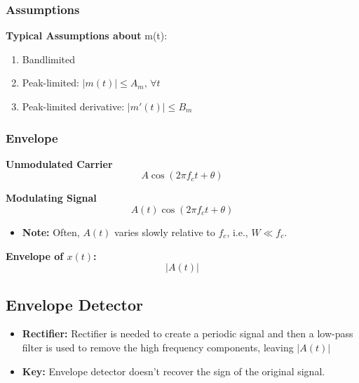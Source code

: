 \subsubsection{Assumptions}
\begin{definition}
    \textbf{Typical Assumptions about } m(t):
    \begin{enumerate}
        \item Bandlimited
        \item Peak-limited: $|m(t)| \leq A_m, \, \forall t$
        \item Peak-limited derivative: $|m'(t)| \leq B_m$
    \end{enumerate}
\end{definition}

\subsubsection{Envelope}
\begin{definition}
    \textbf{Unmodulated Carrier}
    \[
    A \cos(2 \pi f_c t + \theta)
    \]
    \vspace{1em}

    \textbf{Modulating Signal}
    \[
    A(t) \cos(2 \pi f_c t + \theta)
    \]
    \begin{itemize}
        \item \textbf{Note:} Often, \( A(t) \) varies slowly relative to \( f_c \), i.e., \( W \ll f_c \).
    \end{itemize}
    \vspace{1em}

    \textbf{Envelope of $x(t)$:}
    \[
    |A(t)|
    \]
\end{definition}

\subsection{Envelope Detector}
\begin{definition}
    \begin{itemize}
        \item \textbf{Rectifier:} Rectifier is needed to create a periodic signal and then a low-pass filter is used to remove the high frequency components, leaving $|A(t)|$
        \item \textbf{Key:} Envelope detector doesn't recover the sign of the original signal. 
    \end{itemize}
\end{definition}

